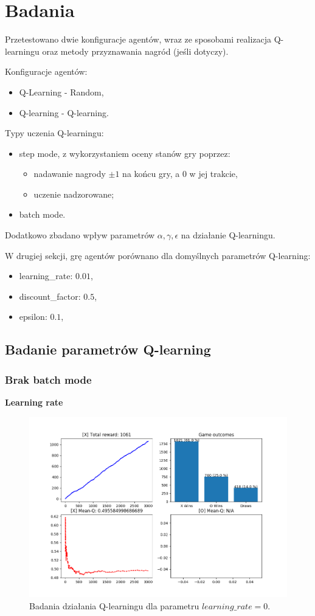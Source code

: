 \section{Badania}

Przetestowano dwie konfiguracje agentów, wraz ze sposobami realizacja Q-learningu oraz metody przyznawania nagród (jeśli dotyczy).

Konfiguracje agentów:
\begin{itemize}
	\item Q-Learning - Random,
	\item Q-learning - Q-learning.
\end{itemize}

Typy uczenia Q-learningu:
\begin{itemize}
	\item step mode, z wykorzystaniem oceny stanów gry poprzez:
	\begin{itemize}
		\item nadawanie nagrody $\pm 1$ na końcu gry, a $0$ w jej trakcie,
		\item uczenie nadzorowane;
	\end{itemize}
	\item batch mode.
\end{itemize}

Dodatkowo zbadano wpływ parametrów $\alpha, \gamma, \epsilon$ na działanie Q-learningu.

W drugiej sekcji, grę agentów porównano dla domyślnych parametrów Q-learning:
\begin{itemize}
	\item learning\_rate: $0.01$,
	\item discount\_factor: $0.5$,
	\item epsilon: $0.1$,
\end{itemize}

\subsection{Badanie parametrów Q-learning}
\subsubsection{Brak batch mode}

\textbf{Learning rate}
\begin{figure}[H]
	\centering
	\includegraphics[width=0.7\linewidth]{imgs/q_learning/analysis/no_batch/lr/lr_0.png}
	\caption{Badania działania Q-learningu dla parametru $learning\_rate = 0$.}
\end{figure}

